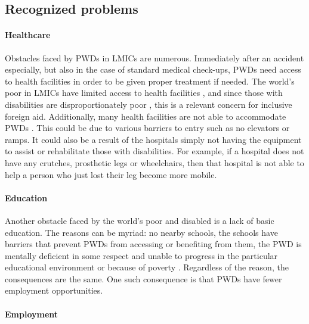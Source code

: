 \documentclass[a4paper]{article}
\begin{document}
\subsection{Recognized problems}

\paragraph{Healthcare}

Obstacles faced by PWDs in LMICs  are numerous. Immediately after an accident
especially, but also in the case of standard medical check-ups, PWDs need
access to health facilities in order to be given proper treatment if needed.
The world's poor in LMICs have limited access to health facilities
\citep{peters2008poverty}, and since those with disabilities are
disproportionately poor \citep{mitra2018disability}, this is a relevant
concern for inclusive foreign aid. Additionally, many health facilities are
not able to accommodate PWDs \citep{drainoni2006cross}. This could be due to
various barriers to entry such as no elevators or ramps. It could also be a
result of the hospitals simply not having the equipment to assist or
rehabilitate those with disabilities. For example, if a hospital does not have
any crutches, prosthetic legs or wheelchairs, then that hospital is not able
to help a person who just lost their leg become more mobile.

\paragraph{Education}

Another obstacle faced by the world’s poor and disabled is a lack of basic
education. The reasons can be myriad: no nearby schools, the schools have
barriers that prevent PWDs from accessing or benefiting from them, the PWD is
mentally deficient in some respect and unable to progress in the particular
educational environment or because of poverty \citep{ingstad2011disability}.
Regardless of the reason, the consequences are the same. One such consequence
is that PWDs have fewer employment opportunities.

\paragraph{Employment}
\end{document}
